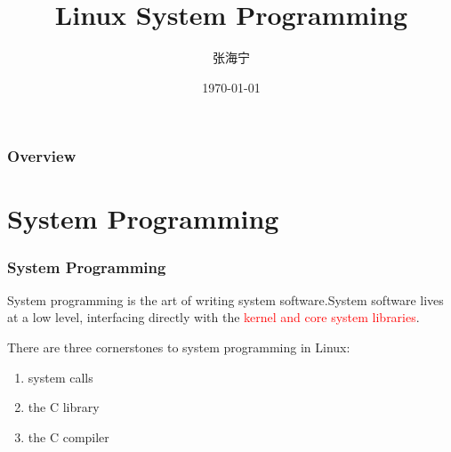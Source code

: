 \documentclass{beamer}
\title[Linux System Programming]{Linux System Programming} %
\author{张海宁} %
\institute[贵大计算机] %
{
贵州大学 \\ %
\medskip
\textit{hnzhang1@gzu.edu.cn} %
}
\date{\today} %
\begin{document}
\begin{frame}
\titlepage %
\end{frame}

\begin{frame}
\frametitle{Overview} %
\tableofcontents %
\end{frame}


\section{System Programming} %
\begin{frame}
\frametitle{System Programming}
System programming is the art of writing system software.System software lives at a low level, interfacing directly with the \textcolor{red}{kernel and core system libraries}.

There are three cornerstones to system programming in Linux: 
\begin{enumerate}
\item system calls
\item the C library
\item the C compiler
\end{enumerate} 
\end{frame}
\end{document}
